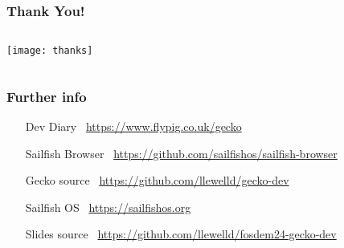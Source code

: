 \documentclass[
	notes=none,
	aspectratio=169
]{beamer}
\begin{document}

\begin{frame}
\frametitle{Thank You!}

\begin{columns}[T]
\begin{column}[T]{1.1\textwidth}

\vspace{-0.5cm}
\texttt{[image: thanks]}

\end{column}
\end{columns}

\end{frame}


\begin{frame}[fragile]
\frametitle{Further info}
\setlength{\leftmargini}{7.0em}
\vspace{0.8cm}

\begin{itemize}
\setlength{\parskip}{1.0em}
\item[Dev Diary] \, \url{https://www.flypig.co.uk/gecko}
\item[Sailfish Browser] \, \url{https://github.com/sailfishos/sailfish-browser}
\item[Gecko source] \, \url{https://github.com/llewelld/gecko-dev}
\item[Sailfish OS] \, \url{https://sailfishos.org}
\item[Slides source] \, \url{https://github.com/llewelld/fosdem24-gecko-dev}
\end{itemize}

\end{frame}

\end{document}
